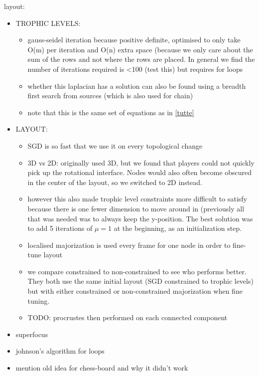 layout:
\begin{itemize}
    \item TROPHIC LEVELS:
    \begin{itemize}
        \item gauss-seidel iteration because positive definite, optimised to only take O(m) per iteration and O(n) extra space (because we only care about the sum of the rows and not where the rows are placed. In general we find the number of iterations required is <100 (test this) but requires for loops~\cite{oliviasimpsonpaper}
        \item whether this laplacian has a solution can also be found using a breadth first search from sources (which is also used for chain)
        \item note that this is the same set of equations as in \eqref{tutte}
    \end{itemize}
    \item LAYOUT:
    \begin{itemize}
        \item SGD is so fast that we use it on every topological change
        \item 3D vs 2D: originally used 3D, but we found that players could not quickly pick up the rotational interface. Nodes would also often become obscured in the center of the layout, so we switched to 2D instead. 
        \item however this also made trophic level constraints more difficult to satisfy because there is one fewer dimension to move around in (previously all that was needed was to always keep the y-position. The best solution was to add 5 iterations of $\mu=1$ at the beginning, as an initialization step.
        \item localised majorization is used every frame for one node in order to fine-tune layout
        \item we compare constrained to non-constrained to see who performs better. They both use the same initial layout (SGD constrained to trophic levels) but with either constrained or non-constrained majorization when fine tuning.
        \item TODO: procrustes then performed on each connected component
    \end{itemize}
    
    \item superfocus
    \item johnson's algorithm for loops
    \item mention old idea for chess-board and why it didn't work
\end{itemize}

